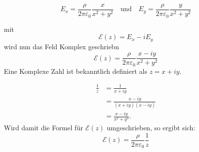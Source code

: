 \begin{equation}
    E_x=
    \frac{\rho}{2\pi\varepsilon_0}
    \frac{x}{x^2+y^2}
    \quad\text{und}\quad
    E_y=
    \frac{\rho}{2\pi\varepsilon_0}
    \frac{y}{x^2+y^2}
\end{equation}

mit 
\begin{equation}
    \mathcal{E}(z)=E_x-iE_y
\end{equation}
wird nun das Feld Komplex geschriebn
\begin{equation}
    \mathcal{E}(z)
    =
    \frac{\rho}{2\pi\varepsilon_0}
    \frac{x-iy}{x^2+y^2}
\end{equation}
Eine Komplexe Zahl ist bekanntlich definiert als $z = x + iy$.

\begin{equation}
\begin{aligned}
    \frac{1}{z}
    &=
    \frac{1}{x+iy}
    \\[2mm]
    &=
    \frac{x-iy}{(x+iy)(x-iy)}
    \\[2mm]
    &=
    \frac{x-iy}{x^2+y^2}.
\end{aligned}
\end{equation}
Wird damit die Formel für $\mathcal{E}(z)$ umgeschrieben, so ergibt sich:
\begin{equation}
    \boxed{
    \mathcal{E}(z)
    =
    \frac{\rho}{2\pi\varepsilon_0}
    \frac{1}{z}
    }
\end{equation}


